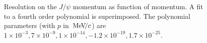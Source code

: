 \begin{figure}[htb!]
\begin{center}
\caption{\small Resolution on the $J/\psi$ momentum as function of
  momentum. A fit to a fourth order polynomial is superimposed. The
  polynomial parameters (with $p$ in $\text{\,Me\kern -0.1em V\!/}c$) are $1 \times 10^{-3}, 7
\times 10^{-9}, 1 \times 10^{-14}, -1.2 \times 10^{-19}, 1.7 \times 10^{-25} $. }
\label{fig:resp}
\end{center}
\end{figure}
